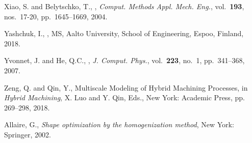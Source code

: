 \begin{thebibliography}{62}
Xiao, S. and Belytschko, T., , {\em Comput. Methods   Appl. Mech.
    Eng.}, vol.~{\bf 193}, nos.~17-20, pp.~1645--1669, 2004.

Yashchuk, I., , MS, Aalto University,
  School of Engineering, Espoo, Finland, 2018.

Yvonnet, J. and He, Q.C., ,
  {\em J. Comput. Phys.}, vol.~{\bf 223}, no.~1, pp.~341--368,
  2007.

Zeng, Q. and Qin, Y., Multiscale Modeling of Hybrid Machining Processes, in \textit{Hybrid Machining}, X. Luo and Y. Qin, Eds., New York: Academic Press, pp. 269--298, 2018.

Allaire, G., {\em Shape optimization by the homogenization method},
 New York: Springer, 2002.

\end{thebibliography}
